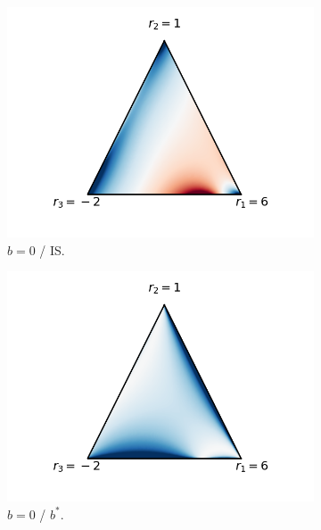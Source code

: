 \begin{figure}[t!]
\begin{center}
\begin{subfigure}[b]{0.08\linewidth}
    \label{fig:is_baseline}
  \end{subfigure}
  \begin{subfigure}[b]{.27\linewidth}
    \includegraphics[trim={2cm 1.5cm 2cm 0mm},clip, width=\textwidth]{articles/baselines/figs/simplex_plots/v_vs_is.png}
    \caption{{\color{myred}$b=0$} / {\color{myblue}IS}.}
  \end{subfigure}
  \begin{subfigure}[b]{0.27\linewidth}
    \includegraphics[trim={2cm 1.5cm 2cm 0},clip,width=\textwidth]{articles/baselines/figs/simplex_plots/v_vs_b.png}
    \caption{{\color{myred}$b=0$} / {\color{myblue}$b^\ast$}.}
  \end{subfigure}
  \begin{subfigure}[b]{0.27\linewidth}

\end{subfigure}
\end{center}
\end{figure}
